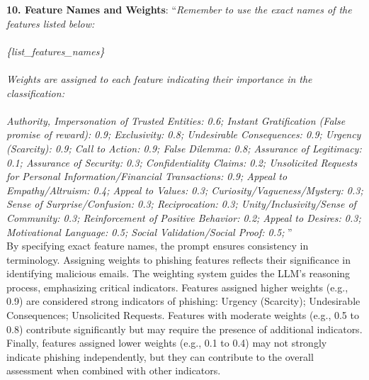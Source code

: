 \noindent \textbf{10. Feature Names and Weights}: ``\textit{Remember to use the exact names of the features listed below: \\ \\ \{list\_features\_names\} \\ \\ Weights are assigned to each feature indicating their importance in the classification: \\ \\ Authority, Impersonation of Trusted Entities: 0.6;
    Instant Gratification (False promise of reward): 0.9;
    Exclusivity: 0.8;
    Undesirable Consequences: 0.9;
    Urgency (Scarcity): 0.9;
    Call to Action: 0.9;
    False Dilemma: 0.8;
    Assurance of Legitimacy: 0.1;
    Assurance of Security: 0.3;
    Confidentiality Claims: 0.2;
    Unsolicited Requests for Personal Information/Financial Transactions: 0.9;
    Appeal to Empathy/Altruism: 0.4;
    Appeal to Values: 0.3;
    Curiosity/Vagueness/Mystery: 0.3;
    Sense of Surprise/Confusion: 0.3;
    Reciprocation: 0.3;
    Unity/Inclusivity/Sense of Community: 0.3;
    Reinforcement of Positive Behavior: 0.2;
    Appeal to Desires: 0.3;
    Motivational Language: 0.5;
    Social Validation/Social Proof: 0.5;
}''\\
\indent By specifying exact feature names, the prompt ensures consistency in terminology. Assigning weights to phishing features reflects their significance in identifying malicious emails. The weighting system guides the LLM’s reasoning process, emphasizing critical indicators.
Features assigned higher weights (e.g., 0.9) are considered strong indicators of phishing: Urgency (Scarcity); Undesirable Consequences; Unsolicited Requests. Features with moderate weights (e.g., 0.5 to 0.8) contribute significantly but may require the presence of additional indicators. Finally, features assigned lower weights (e.g., 0.1 to 0.4) may not strongly indicate phishing independently, but they can contribute to the overall assessment when combined with other indicators.


